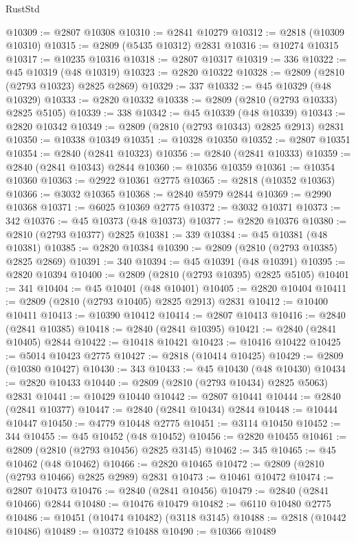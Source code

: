 \begin{lexlean}{RustStd}
\begin{coremodule}
{\begin{coremodule}
{{{{{{{{{{{{{{{{{{{{{{{{{{{{{{{{{@10309 := @2807 @10308
@10310 := @2841 @10279
@10312 := @2818 (@10309 @10310)
@10315 := @2809 (@5435 @10312) @2831
@10316 := @10274 @10315
@10317 := @10235 @10316
@10318 := @2807 @10317
@10319 := 336
@10322 := @45 @10319 (@48 @10319)
@10323 := @2820 @10322
@10328 := @2809 (@2810 (@2793 @10323) @2825 @2869)
@10329 := 337
@10332 := @45 @10329 (@48 @10329)
@10333 := @2820 @10332
@10338 := @2809 (@2810 (@2793 @10333) @2825 @5105)
@10339 := 338
@10342 := @45 @10339 (@48 @10339)
@10343 := @2820 @10342
@10349 := @2809 (@2810 (@2793 @10343) @2825 @2913) @2831
@10350 := @10338 @10349
@10351 := @10328 @10350
@10352 := @2807 @10351
@10354 := @2840 (@2841 @10323)
@10356 := @2840 (@2841 @10333)
@10359 := @2840 (@2841 @10343) @2844
@10360 := @10356 @10359
@10361 := @10354 @10360
@10363 := @2922 @10361 @2775
@10365 := @2818 (@10352 @10363)
@10366 := @3032 @10365
@10368 := @2840 @5979 @2844
@10369 := @2990 @10368
@10371 := @6025 @10369 @2775
@10372 := @3032 @10371
@10373 := 342
@10376 := @45 @10373 (@48 @10373)
@10377 := @2820 @10376
@10380 := @2810 (@2793 @10377) @2825
@10381 := 339
@10384 := @45 @10381 (@48 @10381)
@10385 := @2820 @10384
@10390 := @2809 (@2810 (@2793 @10385) @2825 @2869)
@10391 := 340
@10394 := @45 @10391 (@48 @10391)
@10395 := @2820 @10394
@10400 := @2809 (@2810 (@2793 @10395) @2825 @5105)
@10401 := 341
@10404 := @45 @10401 (@48 @10401)
@10405 := @2820 @10404
@10411 := @2809 (@2810 (@2793 @10405) @2825 @2913) @2831
@10412 := @10400 @10411
@10413 := @10390 @10412
@10414 := @2807 @10413
@10416 := @2840 (@2841 @10385)
@10418 := @2840 (@2841 @10395)
@10421 := @2840 (@2841 @10405) @2844
@10422 := @10418 @10421
@10423 := @10416 @10422
@10425 := @5014 @10423 @2775
@10427 := @2818 (@10414 @10425)
@10429 := @2809 (@10380 @10427)
@10430 := 343
@10433 := @45 @10430 (@48 @10430)
@10434 := @2820 @10433
@10440 := @2809 (@2810 (@2793 @10434) @2825 @5063) @2831
@10441 := @10429 @10440
@10442 := @2807 @10441
@10444 := @2840 (@2841 @10377)
@10447 := @2840 (@2841 @10434) @2844
@10448 := @10444 @10447
@10450 := @4779 @10448 @2775
@10451 := @3114 @10450
@10452 := 344
@10455 := @45 @10452 (@48 @10452)
@10456 := @2820 @10455
@10461 := @2809 (@2810 (@2793 @10456) @2825 @3145)
@10462 := 345
@10465 := @45 @10462 (@48 @10462)
@10466 := @2820 @10465
@10472 := @2809 (@2810 (@2793 @10466) @2825 @2989) @2831
@10473 := @10461 @10472
@10474 := @2807 @10473
@10476 := @2840 (@2841 @10456)
@10479 := @2840 (@2841 @10466) @2844
@10480 := @10476 @10479
@10482 := @6110 @10480 @2775
@10486 := @10451 (@10474 @10482) (@3118 @3145)
@10488 := @2818 (@10442 @10486)
@10489 := @10372 @10488
@10490 := @10366 @10489
}}}}}}}}}}}}}}}}}}}}}}}}}}}}}}}}}
\end{coremodule}}
\end{coremodule}
\end{lexlean}
